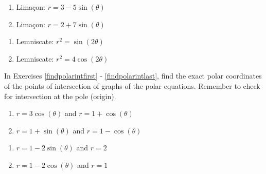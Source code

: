 \documentclass{ximera}
\begin{document}
\begin{multicols}{2} 

\begin{enumerate}

\setcounter{enumi}{\value{HW}}

\item Lima\c{c}on: $r = 3-5\sin(\theta)$
\item Lima\c{c}on: $r = 2 + 7\sin(\theta)$ 

\setcounter{HW}{\value{enumi}}

\end{enumerate}

\end{multicols}

\begin{multicols}{2} 

\begin{enumerate}

\setcounter{enumi}{\value{HW}}

\item Lemniscate: $r^{2} = \sin(2\theta)$ 
\item Lemniscate: $r^{2} = 4\cos(2\theta)$ \label{polarplotlast}

\setcounter{HW}{\value{enumi}}

\end{enumerate}

\end{multicols}

In Exercises \ref{findpolarintfirst} - \ref{findpolarintlast}, find the exact polar coordinates of the points of intersection of graphs of the polar equations.  Remember to check for intersection at the pole (origin).

\begin{multicols}{2}

\begin{enumerate}

\setcounter{enumi}{\value{HW}}

\item $r = 3\cos(\theta)$ and $r = 1 + \cos(\theta)$ \label{findpolarintfirst}
\item $r = 1 + \sin(\theta)$ and $r = 1 - \cos(\theta)$

\setcounter{HW}{\value{enumi}}

\end{enumerate}

\end{multicols}

\begin{multicols}{2} 

\begin{enumerate}

\setcounter{enumi}{\value{HW}}

\item $r = 1-2\sin(\theta)$ and $r=2$
\item $r = 1 - 2\cos(\theta)$ and $r = 1$

\setcounter{HW}{\value{enumi}}

\end{enumerate}

\end{multicols}
\end{document}

